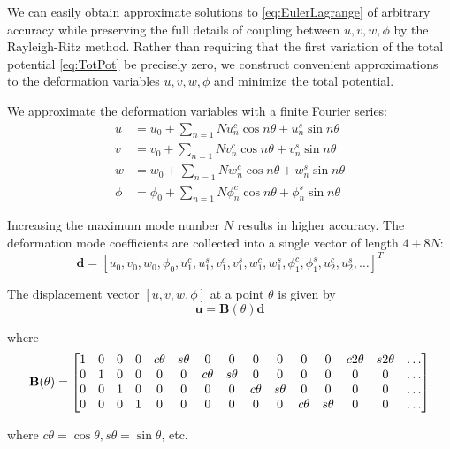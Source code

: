\documentclass[\rootdir/thesis.tex]{subfiles}
\begin{document}
We can easily obtain approximate solutions to \eqref{eq:EulerLagrange} of arbitrary accuracy while preserving the full details of coupling between $u,v,w,\phi$ by the Rayleigh-Ritz method. Rather than requiring that the first variation of the total potential \eqref{eq:TotPot} be precisely zero, we construct convenient approximations to the deformation variables $u,v,w,\phi$ and minimize the total potential.

We approximate the deformation variables with a finite Fourier series:
\begin{align}
\label{eq:mm_FourierDef}
u &= u_0 + \sum_{n=1}{N} u_n^c \cos{n\theta} + u_n^s \sin{n\theta}\\
v &= v_0 + \sum_{n=1}{N} v_n^c \cos{n\theta} + v_n^s \sin{n\theta}\\
w &= w_0 + \sum_{n=1}{N} w_n^c \cos{n\theta} + w_n^s \sin{n\theta}\\
\phi &= \phi_0 + \sum_{n=1}{N} \phi_n^c \cos{n\theta} + \phi_n^s \sin{n\theta}
\end{align}

Increasing the maximum mode number $N$ results in higher accuracy. The deformation mode coefficients are collected into a single vector of length $4+8N$:
\begin{equation}
\mathbf{d} = [u_0,v_0,w_0,\phi_0,u_1^c,u_1^s,v_1^c,v_1^s,w_1^c,w_1^s,\phi_1^c,\phi_1^s,u_2^c,u_2^s,\dots]^T
\end{equation}

The displacement vector $[u,v,w,\phi]$ at a point $\theta$ is given by
\begin{equation}
\label{eq:u_Bd}
\mathbf{u} = \mathbf{B}(\theta)\mathbf{d}
\end{equation}

where
\begin{equation}
\setcounter{MaxMatrixCols}{16}
\mathbf{B}(\theta) =
\begin{bmatrix}
1 & 0 & 0 & 0 & c\theta & s\theta & 0 & 0 & 0 & 0 & 0 & 0 & c2\theta & s2\theta & \dots\\
0 & 1 & 0 & 0 & 0 & 0 & c\theta & s\theta & 0 & 0 & 0 & 0 & 0 & 0 & \dots\\
0 & 0 & 1 & 0 & 0 & 0 & 0 & 0 & c\theta & s\theta & 0 & 0 & 0 & 0 & \dots\\
0 & 0 & 0 & 1 & 0 & 0 & 0 & 0 & 0 & 0 & c\theta & s\theta & 0 & 0 & \dots
\end{bmatrix}
\end{equation}

where $c\theta=\cos{\theta}, s\theta=\sin{\theta}$, etc.
\end{document}
